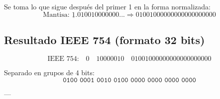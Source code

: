 \documentclass[a4paper,12pt]{article}
\begin{document}
\begin{center}
		Se toma lo que sigue después del primer 1 en la forma normalizada:
		\vspace{-0.5em}
		\[
		\text{Mantisa: } \underline{1}.010010000000... \Rightarrow 01001000000000000000000
		\]
		
		\subsection*{Resultado IEEE 754 (formato 32 bits)}
		
		\[
		\text{IEEE 754:} \quad 
		\boxed{0} \quad \boxed{10000010} \quad \boxed{01001000000000000000000}
		\]
		
		Separado en grupos de 4 bits:
		\vspace{-0.5em}
		\[
		\texttt{0100\ 0001\ 0010\ 0100\ 0000\ 0000\ 0000\ 0000}
		\]

		---	
	\end{center}
\end{document}
